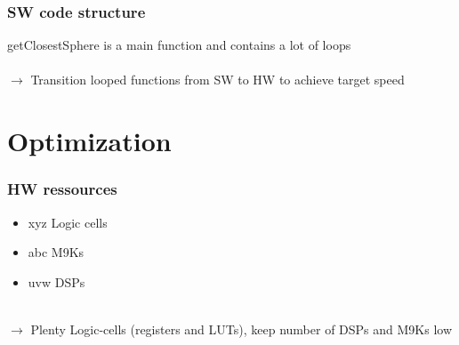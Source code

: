 \documentclass{beamer}
\begin{document}
\begin{frame} %
	\frametitle{SW code structure} %
	getClosestSphere is a main function and contains a lot of loops\\
	$\quad$\\
	$\rightarrow$ Transition looped functions from SW to HW to achieve target speed
\end{frame}

\section{Optimization}

\begin{frame} %
	\frametitle{HW ressources} %
	\begin{itemize}
		\item xyz Logic cells
		\item abc M9Ks
		\item uvw DSPs
	\end{itemize}
	$\quad$\\
	$\rightarrow$ Plenty Logic-cells (registers and LUTs), keep number of DSPs and M9Ks low
\end{frame}
\end{document}
